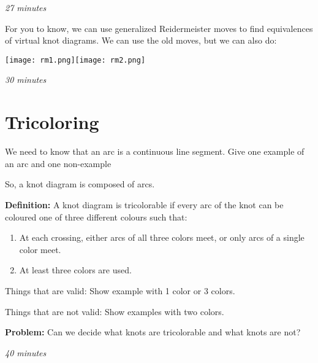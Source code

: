 \documentclass[12pt,letterpaper]{article}
\begin{document}
	\textit{27 minutes}
	
	For you to know, we can use generalized Reidermeister moves to find equivalences of virtual knot diagrams. We can use the old moves, but we can also do:
	
	\texttt{[image: rm1.png]}\hspace{1cm}\texttt{[image: rm2.png]}
	
	\textit{30 minutes}
	
	\section{Tricoloring}  
	
    We need to know that an arc is a continuous line segment. Give one example of an arc and one non-example
    
    So, a knot diagram is composed of arcs.
	
	\textbf{Definition:} A knot diagram is tricolorable if every arc of the knot can be coloured one of three different colours such that:
	\begin{enumerate}
	    \item At each crossing, either arcs of all three colors meet, or only arcs of a single color meet.
	    \item At least three colors are used.
	\end{enumerate}
	
	Things that are valid: Show example with 1 color or 3 colors.
	
	Things that are not valid: Show examples with two colors.
	
	\textbf{Problem: }Can we decide what knots are tricolorable and what knots are not?
	
		\textit{40 minutes}
	
\end{document}
